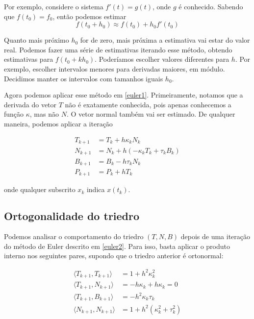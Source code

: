 \documentclass{article}
\begin{document}
Por exemplo, considere o sistema $f'(t) = g(t)$, onde $g$ é conhecido. Sabendo que $f(t_0) = f_0$, então podemos estimar 
\[f(t_0 + h_0) \approx f(t_0) + h_0f'(t_0)\]

Quanto mais próximo $h_0$ for de zero, mais próxima a estimativa vai estar do valor real. Podemos fazer uma série de estimativas iterando esse método, obtendo estimativas para $f(t_0 + kh_0)$. Poderíamos escolher valores diferentes para $h$. Por exemplo, escolher intervalos menores para derivadas maiores, em módulo. Decidimos manter os intervalos com tamanhos iguais $h_0$.

Agora podemos aplicar esse método em \ref{euler1}. Primeiramente, notamos que a derivada do vetor $T$ não é exatamente conhecida, pois apenas conhecemos a função $\kappa$, mas não $N$. O vetor normal também vai ser estimado. De qualquer maneira, podemos aplicar a iteração

\begin{equation}
    \begin{split}
        T_{k + 1} & = T_k + h\kappa_k N_k \\
        N_{k + 1} & = N_k + h(-\kappa_k T_k + \tau_k B_k) \\
        B_{k + 1} & = B_k - h\tau_k N_k \\
        P_{k + 1} & = P_k + hT_k
    \end{split}
    \label{euler2}
\end{equation}

onde qualquer subscrito $x_k$ indica $x(t_k)$.

\subsection{Ortogonalidade do triedro}

Podemos analisar o comportamento do triedro $(T, N, B)$ depois de uma iteração do método de Euler descrito em \ref{euler2}. Para isso, basta aplicar o produto interno nos seguintes pares, supondo que o triedro anterior é ortonormal:

\begin{equation}
    \begin{split}
        \langle T_{k + 1}, T_{k + 1}\rangle & = 1 + h^2\kappa_k^2 \\
        \langle T_{k + 1}, N_{k +1 }\rangle & = - h\kappa_k + h\kappa_k = 0 \\
        \langle T_{k + 1}, B_{k + 1}\rangle & = -h^2\kappa_k\tau_k \\
        \langle N_{k + 1}, N_{k + 1}\rangle & = 1 + h^2(\kappa_k^2 + \tau_k^2) \\
    \end{split}
    \label{euler3}
\end{equation}
\end{document}
